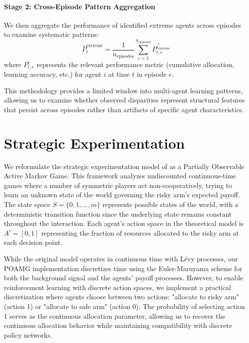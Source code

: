 \paragraph{Stage 2: Cross-Episode Pattern Aggregation} We then aggregate the performance of identified extreme agents across episodes to examine systematic patterns:
\begin{equation}
    \bar{P}_t^{\text{extreme}} = \frac{1}{n_{\text{episodes}}} \sum_{e=1}^{n_{\text{episodes}}} P_{t,e}^{i_{\text{extreme}}^e}
\end{equation}
where $P_{t,e}^i$ represents the relevant performance metric (cumulative allocation, learning accuracy, etc.) for agent $i$ at time $t$ in episode $e$.

This methodology provides a limited window into multi-agent learning patterns, allowing us to examine whether observed disparities represent structural features that persist across episodes rather than artifacts of specific agent characteristics.

\section{Strategic Experimentation}

We reformulate the strategic experimentation model of \citet{keller2020undiscounted} as a Partially Observable Active Markov Game. This framework analyzes undiscounted continuous-time games where a number of symmetric players act non-cooperatively, trying to learn an unknown state of the world governing the risky arm's expected payoff. The state space $S = \{0,1,\ldots,m\}$ represents possible states of the world, with a deterministic transition function since the underlying state remains constant throughout the interaction. Each agent's action space in the theoretical model is $A^i = [0,1]$ representing the fraction of resources allocated to the risky arm at each decision point.

While the original model operates in continuous time with Lévy processes, our POAMG implementation discretizes time using the Euler-Maruyama scheme \citep{kloeden1992numerical, platen1999introduction} for both the background signal and the agents' payoff processes. However, to enable reinforcement learning with discrete action spaces, we implement a practical discretization where agents choose between two actions: "allocate to risky arm" (action 1) or "allocate to safe arm" (action 0). The probability of selecting action 1 serves as the continuous allocation parameter, allowing us to recover the continuous allocation behavior while maintaining compatibility with discrete policy networks.

